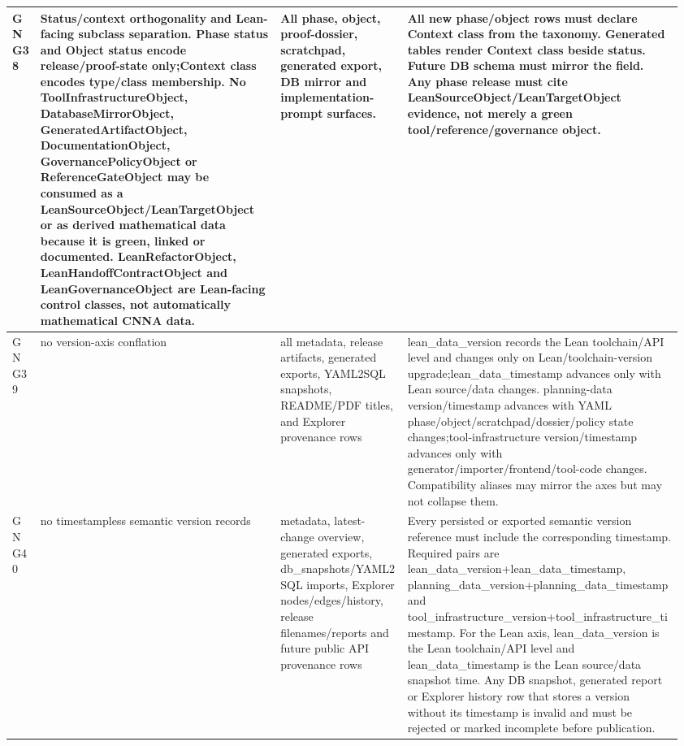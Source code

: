 \begin{longtable}{L{0.045\linewidth} L{0.345\linewidth} L{0.185\linewidth} L{0.39\linewidth}}
\hline
\addlinespace[0.24em]
GNG38 & Status/\allowbreak{}context orthogonality and Lean-facing subclass separation. Phase status and Object status encode release/\allowbreak{}proof-state only;\newline Context class encodes type/\allowbreak{}class membership. No ToolInfrastructureObject, DatabaseMirrorObject, GeneratedArtifactObject, DocumentationObject, GovernancePolicyObject or ReferenceGateObject may be consumed as a LeanSourceObject/\allowbreak{}LeanTargetObject or as derived mathematical data because it is green, linked or documented. LeanRefactorObject, LeanHandoffContractObject and LeanGovernanceObject are Lean-facing control classes, not automatically mathematical CNNA data. & All phase, object, proof-dossier, scratchpad, generated export, DB mirror and implementation-prompt surfaces. & All new phase/\allowbreak{}object rows must declare Context class from the taxonomy. Generated tables render Context class beside status. Future DB schema must mirror the field. Any phase release must cite LeanSourceObject/\allowbreak{}LeanTargetObject evidence, not merely a green tool/\allowbreak{}reference/\allowbreak{}governance object.\\
\hline
\addlinespace[0.24em]
GNG39 & no version-axis conflation & all metadata, release artifacts, generated exports, YAML2SQL snapshots, README/\allowbreak{}PDF titles, and Explorer provenance rows & lean\_data\_version records the Lean toolchain/\allowbreak{}API level and changes only on Lean/\allowbreak{}toolchain-version upgrade;\newline lean\_data\_timestamp advances only with Lean source/\allowbreak{}data changes. planning-data version/\allowbreak{}timestamp advances with YAML phase/\allowbreak{}object/\allowbreak{}scratchpad/\allowbreak{}dossier/\allowbreak{}policy state changes;\newline tool-infrastructure version/\allowbreak{}timestamp advances only with generator/\allowbreak{}importer/\allowbreak{}frontend/\allowbreak{}tool-code changes. Compatibility aliases may mirror the axes but may not collapse them.\\
\hline
\addlinespace[0.24em]
GNG40 & no timestampless semantic version records & metadata, latest-change overview, generated exports, db\_snapshots/\allowbreak{}YAML2SQL imports, Explorer nodes/\allowbreak{}edges/\allowbreak{}history, release filenames/\allowbreak{}reports and future public API provenance rows & Every persisted or exported semantic version reference must include the corresponding timestamp. Required pairs are lean\_data\_version+lean\_data\_timestamp, planning\_data\_version+planning\_data\_timestamp and tool\_infrastructure\_version+tool\_infrastructure\_timestamp. For the Lean axis, lean\_data\_version is the Lean toolchain/\allowbreak{}API level and lean\_data\_timestamp is the Lean source/\allowbreak{}data snapshot time. Any DB snapshot, generated report or Explorer history row that stores a version without its timestamp is invalid and must be rejected or marked incomplete before publication.\\

\end{longtable}
